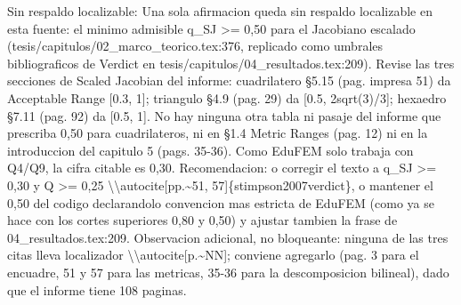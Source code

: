 \documentclass[11pt,a4paper]{article}
\newcommand{\campo}[1]{\textcolor{gris}{\footnotesize #1}}
\begin{document}
{\small\campo{Sin respaldo localizable:} Una sola afirmacion queda sin respaldo localizable en esta fuente: el minimo admisible q\_SJ \textgreater{}= 0,50 para el Jacobiano escalado (tesis/capitulos/02\_marco\_teorico.tex:376, replicado como \textquotedbl{}umbrales bibliograficos de Verdict\textquotedbl{} en tesis/capitulos/04\_resultados.tex:209). Revise las tres secciones de Scaled Jacobian del informe: cuadrilatero §5.15 (pag. impresa 51) da Acceptable Range [0.3, 1]; triangulo §4.9 (pag. 29) da [0.5, 2sqrt(3)/3]; hexaedro §7.11 (pag. 92) da [0.5, 1]. No hay ninguna otra tabla ni pasaje del informe que prescriba 0,50 para cuadrilateros, ni en §1.4 Metric Ranges (pag. 12) ni en la introduccion del capitulo 5 (pags. 35-36). Como EduFEM solo trabaja con Q4/Q9, la cifra citable es 0,30. Recomendacion: o corregir el texto a \textquotedbl{}q\_SJ \textgreater{}= 0,30 y Q \textgreater{}= 0,25 \textbackslash{}\textbackslash{}autocite[pp.\textasciitilde{}51, 57]\{stimpson2007verdict\}\textquotedbl{}, o mantener el 0,50 del codigo declarandolo convencion mas estricta de EduFEM (como ya se hace con los cortes superiores 0,80 y 0,50) y ajustar tambien la frase de 04\_resultados.tex:209. Observacion adicional, no bloqueante: ninguna de las tres citas lleva localizador \textbackslash{}\textbackslash{}autocite[p.\textasciitilde{}NN]; conviene agregarlo (pag. 3 para el encuadre, 51 y 57 para las metricas, 35-36 para la descomposicion bilineal), dado que el informe tiene 108 paginas.\par}
\end{document}
